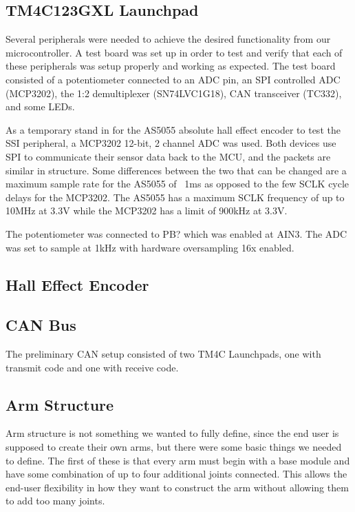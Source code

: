 \subsection{TM4C123GXL Launchpad}
Several peripherals were needed to achieve the desired functionality from our microcontroller. A test board was set up in order to test and verify that each of these peripherals was setup properly and working as expected. The test board consisted of a potentiometer connected to an ADC pin, an SPI controlled ADC (MCP3202), the 1:2 demultiplexer (SN74LVC1G18), CAN transceiver (TC332), and some LEDs.

As a temporary stand in for the AS5055 absolute hall effect encoder to test the SSI peripheral, a MCP3202 12-bit, 2 channel ADC was used. Both devices use SPI to communicate their sensor data back to the MCU, and the packets are similar in structure. Some differences between the two that can be changed are a maximum sample rate for the AS5055 of ~1ms as opposed to the few SCLK cycle delays for the MCP3202. The AS5055 has a maximum SCLK frequency of up to 10MHz at 3.3V while the MCP3202 has a limit of 900kHz at 3.3V. 

The potentiometer was connected to PB? which was enabled at AIN3. The ADC was set to sample at 1kHz with hardware oversampling 16x enabled. 
\subsection{Hall Effect Encoder}
\subsection{CAN Bus}
The preliminary CAN setup consisted of two TM4C Launchpads, one with transmit code and one with receive code.


\subsection{Arm Structure}
Arm structure is not something we wanted to fully define, since the end user is supposed to create their own arms, but there were some basic things we needed to define. The first of these is that every arm must begin with a base module and have some combination of up to four additional joints connected.  This allows the end-user flexibility in how they want to construct the arm without allowing them to add too many joints.

